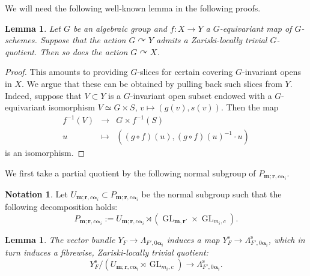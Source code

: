 \documentclass[a4paper,12pt]{article}
\theoremstyle{definition}
\newtheorem{notation}[definition]{Notation}
\theoremstyle{plain}
\newtheorem{lemma}[definition]{Lemma}
\theoremstyle{remark}
\DeclareMathOperator{\GL}{GL}
\newcommand{\st}{\mathrm{s}}
\newcommand\bfalpha{\bm{\alpha}}
\newcommand\bfm{\mathbf{m}}
\newcommand\bfr{\mathbf{r}}
\begin{document}
We will need the following well-known lemma in the following proofs.


\begin{lemma}\label{Lem/slicesPullback}
Let $G$ be an algebraic group and $f \colon X\rightarrow Y$ a $G$-equivariant map of $G$-schemes. Suppose that the action $G\curvearrowright Y$ admits a Zariski-locally trivial $G$-quotient. Then so does the action $G\curvearrowright X$.
\end{lemma}

\begin{proof}
This amounts to providing $G$-slices for certain covering $G$-invariant opens in $X$. We argue that these can be obtained by pulling back such slices from $Y$. Indeed, suppose that $V\subset Y$ is a $G$-invariant open subset endowed with a $G$-equivariant isomorphism $V\simeq G\times S$, $v\mapsto (g(v),s(v))$. Then the map
\[
\begin{array}{rcl}
f^{-1}(V) & \rightarrow & G\times f^{-1}(S) \\
u & \mapsto & \left((g\circ f)(u),(g\circ f)(u)^{-1}\cdot u\right)
\end{array}
\]
is an isomorphism.
\end{proof}

We first take a partial quotient by the following normal subgroup of $P_{\bfm;\bfr,c\bfalpha_i}$.

\begin{notation}
Let $U_{\bfm;\bfr,c\bfalpha_i}\subset P_{\bfm;\bfr,c\bfalpha_i}$ be the normal subgroup such that the following decomposition holds:
\[
P_{\bfm;\bfr,c\bfalpha_i}:=U_{\bfm;\bfr,c\bfalpha_i}\rtimes (\GL_{\bfm,\bfr'}\times\GL_{m_i,c})
.
\]
\end{notation}


\begin{lemma}\label{Lem/partialQuotient}
The vector bundle $Y_F\rightarrow\Lambda_{F',0\bfalpha_i}$ induces a map $Y_F^\st\rightarrow\Lambda_{F',0\bfalpha_i}^\st$, which in turn induces a fibrewise, Zariski-locally trivial quotient:
\begin{equation}\label{eq relative morphism inductive step}
    Y_F^\st/(U_{\bfm;\bfr,c\bfalpha_i}\rtimes\GL_{m_i,c})\rightarrow\Lambda_{F',0\bfalpha_i}^\st .
\end{equation}
\end{lemma}
\end{document}
